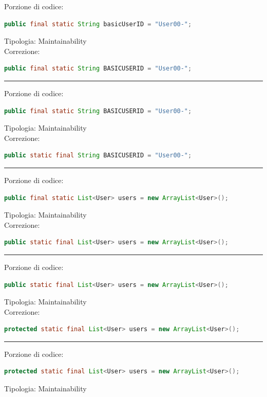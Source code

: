 \documentclass{article}
\begin{document}
Porzione di codice:
\begin{lstlisting}[language=Java]
public final static String basicUserID = "User00-";
\end{lstlisting}
Tipologia: Maintainability\\
Correzione:
\begin{lstlisting}[language=Java]
public final static String BASICUSERID = "User00-";
\end{lstlisting}
\vspace{.5em}\hrule\vspace{.5em}
Porzione di codice:
\begin{lstlisting}[language=Java]
public final static String BASICUSERID = "User00-";
\end{lstlisting}
Tipologia: Maintainability\\
Correzione:
\begin{lstlisting}[language=Java]
public static final String BASICUSERID = "User00-";
\end{lstlisting}
\vspace{.5em}\hrule\vspace{.5em}
Porzione di codice:
\begin{lstlisting}[language=Java]
public final static List<User> users = new ArrayList<User>();
\end{lstlisting}
Tipologia: Maintainability\\
Correzione:
\begin{lstlisting}[language=Java]
public static final List<User> users = new ArrayList<User>();
\end{lstlisting}
\vspace{.5em}\hrule\vspace{.5em}
Porzione di codice:
\begin{lstlisting}[language=Java]
public static final List<User> users = new ArrayList<User>();
\end{lstlisting}
Tipologia: Maintainability\\
Correzione:
\begin{lstlisting}[language=Java]
protected static final List<User> users = new ArrayList<User>();
\end{lstlisting}
\vspace{.5em}\hrule\vspace{.5em}
Porzione di codice:
\begin{lstlisting}[language=Java]
protected static final List<User> users = new ArrayList<User>();
\end{lstlisting}
Tipologia: Maintainability\\
\end{document}
